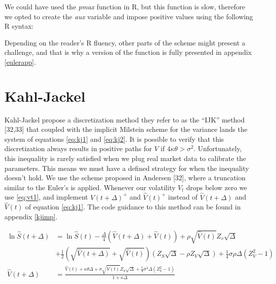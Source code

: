 \documentclass[12pt,twoside]{reedthesis}
\theoremstyle{definition}
\theoremstyle{definition}
\theoremstyle{remark}
\begin{document}
  We could have used the \emph{pmax} function in R, but this function is
  slow, therefore we opted to create the \emph{aux} variable and impose
  positive values using the following R syntax:
  \begin{Shaded}
  \begin{Highlighting}[]
  \StringTok{ }
  \NormalTok{  aux[v }\OperatorTok{<}\StringTok{ }\NormalTok{] <-}\StringTok{ }
  \end{Highlighting}
  \end{Shaded}
  Depending on the reader's R fluency, other parts of the scheme might
  present a challenge, and that is why a version of the function is fully
  presented in appendix \ref{eulerapp}.
  
  \section{Kahl-Jackel}\label{kahl-jackel}
  
  Kahl-Jackel propose a discretization method they refer to as the ``IJK''
  method {[}32,33{]} that coupled with the implicit Milstein scheme for
  the variance lands the system of equations \eqref{eq:kj1} and
  \eqref{eq:kj2}. It is possible to verify that this discretization always
  results in positive paths for \(V\) if \(4 \kappa \theta > \sigma^2\).
  Unfortunately, this inequality is rarely satisfied when we plug real
  market data to calibrate the parameters. This means we must have a
  defined strategy for when the inequality doesn't hold. We use the scheme
  proposed in Andersen {[}32{]}, where a truncation similar to the Euler's
  is applied. Whenever our volatility \(V_t\) drops below zero we use
  \eqref{eq:vt1}, and implement \(\hat{V}(t+\Delta)^{+}\) and
  \(\hat{V}(t)^{+}\) instead of \(\hat{V}(t+\Delta)\) and \(\hat{V}(t)\)
  of equation \eqref{eq:kj1}. The code guidance to this method can be found
  in appendix \ref{kjimp}.
  \begin{small}
  \begin{align}
  \label{eq:kj1}
  \ln \hat{S}(t + \Delta) &= \ln \hat{S}(t) - \frac{\Delta}{4}\left( \hat{V}(t+\Delta) + \hat{V}(t) \right) + \rho \sqrt{\hat{V}(t)}Z_v\sqrt{\Delta} \\ \nonumber
  &+ \frac{1}{2} \left( \sqrt{\hat{V}(t+\Delta)} + \sqrt{\hat{V}(t)} \right) \left( Z_S \sqrt{\Delta} - \rho Z_V \sqrt{\Delta}\right) + \frac{1}{4} \sigma \rho \Delta \left( Z_{V}^{2} - 1 \right) \\
  \label{eq:kj2}
  \hat{V}(t+\Delta) &= \frac{\hat{V}(t) + \kappa \theta \Delta + \sigma \sqrt{\hat{V}(t)}Z_V \sqrt{\Delta}+ \frac{1}{4}\sigma^2 \Delta \left(Z_V^2-1 \right)}{1+ \kappa \Delta}
  \end{align}
  \end{small}
\end{document}

